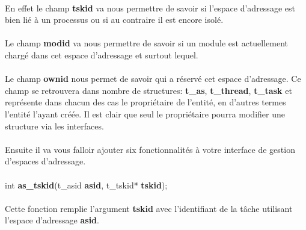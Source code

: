 \documentclass[10pt,a4wide]{article}
\begin{document}
\paragraph{}

En effet le champ \textbf{tskid} va nous permettre de savoir si l'espace
d'adressage est bien li\'e \`a un processus ou si au contraire il est encore
isol\'e.

\paragraph{}

Le champ \textbf{modid} va nous permettre de savoir si un module est
actuellement charg\'e dans cet espace d'adressage et surtout lequel.

\paragraph{}

Le champ \textbf{ownid} nous permet de savoir qui a r\'eserv\'e cet
espace d'adressage. Ce champ se retrouvera dans nombre de structures:
\textbf{t\_as}, \textbf{t\_thread}, \textbf{t\_task} et repr\'esente
dans chacun des cas le propri\'etaire de l'entit\'e, en d'autres termes
l'entit\'e l'ayant cr\'e\'ee. Il est clair que seul le propri\'etaire
pourra modifier une structure via les interfaces.

\paragraph{}

Ensuite il va vous falloir ajouter six fonctionnalit\'es \`a votre
interface de gestion d'espaces d'adressage.

\paragraph{}

\hspace{1.5cm}int \textbf{as\_tskid}(t\_asid \textbf{asid},
                                     t\_tskid* \textbf{tskid});

\paragraph{}

Cette fonction remplie l'argument \textbf{tskid} avec l'identifiant
de la t\^ache utilisant l'espace d'adressage \textbf{asid}.
\end{document}
